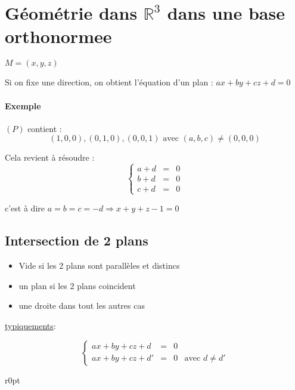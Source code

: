 \section{Géométrie dans $\mathbb{R}^3$ dans une base orthonormee}

$M = (x, y, z)$

Si on fixe une direction, on obtient l'équation d'un plan : $ax + by + cz + d = 0$

\paragraph{Exemple} $(P)$ contient : \[(1, 0, 0), (0, 1, 0), (0, 0, 1) \text{ avec } (a, b, c) \neq (0, 0, 0)\]


Cela revient à résoudre :
\[\left\{\begin{array}{rcl}
	a+d &=& 0 \\
	b+d &=& 0 \\
	c+d &=& 0\end{array}\right.\]

c'est à dire $a=b=c=-d \Rightarrow x + y + z - 1 = 0$

\subsection{Intersection de 2 plans}
\begin{itemize}
	\item Vide si les 2 plans sont parallèles et distincs
	\item un plan si les 2 plans coincident
	\item une droite dans tout les autres cas
\end{itemize}

\ul{typiquements}:

\[\left\{\begin{array}{rcll}
	ax + by + cz + d &=& 0 \\
	ax + by + cz + d' &=& 0 & \text{avec } d \neq d'\end{array}\right.\]

\begin{wrapfigure}[6]{r}{0pt}
\end{wrapfigure}


